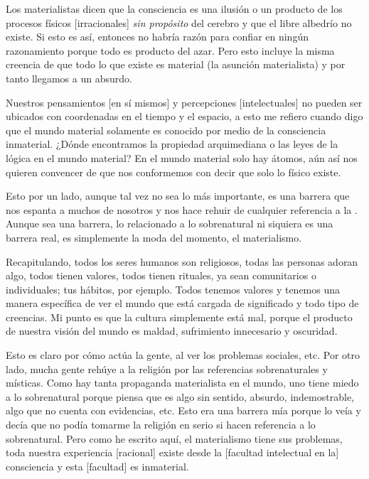 \documentclass[12pt]{article}
\begin{document}
	Los materialistas dicen que la consciencia es una ilusión o un producto
	de los procesos físicos [irracionales] \textit{sin propósito} del
	cerebro y que el
	libre albedrío no existe. Si esto es así, entonces no habría razón para
	confiar en ningún razonamiento porque todo es producto del azar. Pero
	esto incluye la misma creencia de que todo lo que existe es material (la
	asunción materialista) y por tanto llegamos a un absurdo.

	Nuestros pensamientos [en sí mismos] y percepciones [intelectuales] no
	pueden ser ubicados con coordenadas en el tiempo y el espacio, a esto me
	refiero cuando digo que el mundo material solamente es conocido por
	medio de la consciencia inmaterial. ¿Dónde encontramos la propiedad
	arquimediana o las leyes de la lógica en el mundo material? En el mundo
	material solo hay átomos, aún así nos quieren convencer de que nos
	conformemos con decir que solo lo físico existe.

	Esto por un lado, aunque tal vez no sea lo más importante, es una
	barrera que nos espanta a muchos de nosotros y nos hace rehuir de
	cualquier referencia a la . Aunque sea una barrera,
	lo relacionado a lo sobrenatural ni siquiera es una barrera real, es
	simplemente la moda del momento, el materialismo.

	Recapitulando, todos los seres humanos son religiosos, todas las
	personas adoran algo, todos tienen valores, todos tienen rituales, ya
	sean comunitarios o individuales; tus hábitos, por ejemplo. Todos
	tenemos valores y tenemos una manera específica de ver el mundo que está
	cargada de significado y todo tipo de creencias. Mi punto es que la
	cultura simplemente está mal, porque el producto de nuestra visión del
	mundo es maldad, sufrimiento innecesario y oscuridad.

	Esto es claro por cómo actúa la gente, al ver los problemas sociales,
	etc. Por otro lado, mucha gente rehúye a la religión por las referencias
	sobrenaturales y místicas. Como hay tanta propaganda materialista en el
	mundo, uno tiene miedo a lo sobrenatural porque piensa que es algo sin
	sentido, absurdo, indemostrable, algo que no cuenta con evidencias, etc.
	Esto era una barrera mía porque lo veía y decía que no podía tomarme la
	religión en serio si hacen referencia a lo sobrenatural. Pero como he
	escrito aquí, el materialismo tiene sus problemas, toda nuestra
	experiencia [racional] existe desde la [facultad intelectual en la]
	consciencia y esta [facultad] es inmaterial.
	
\end{document}
